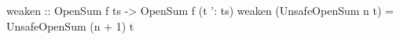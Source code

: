 \begin{code}
weaken :: OpenSum f ts -> OpenSum f (t ': ts)
weaken (UnsafeOpenSum n t) = UnsafeOpenSum (n + 1) t
\end{code}
